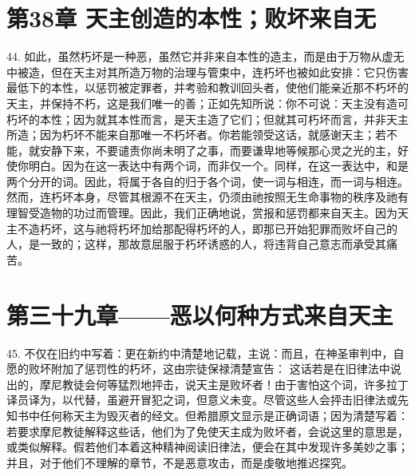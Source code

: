 
\section{第38章 天主创造的本性；败坏来自无}

44. 如此，虽然朽坏是一种恶，虽然它并非来自本性的造主，而是由于万物从虚无中被造，但在天主对其所造万物的治理与管束中，连朽坏也被如此安排：它只伤害最低下的本性，以惩罚被定罪者，并考验和教训回头者，使他们能亲近那不朽坏的天主，并保持不朽，这是我们唯一的善；正如先知所说：你不可说：天主没有造可朽坏的本性；因为就其本性而言，是天主造了它们；但就其可朽坏而言，并非天主所造；因为朽坏不能来自那唯一不朽坏者。你若能领受这话，就感谢天主；若不能，就安静下来，不要谴责你尚未明了之事，而要谦卑地等候那心灵之光的主，好使你明白。因为在这一表达中有两个词，而非仅一个。同样，在这一表达中，和是两个分开的词。因此，将属于各自的归于各个词，使一词与相连，而一词与相连。然而，连朽坏本身，尽管其根源不在天主，仍须由祂按照无生命事物的秩序及祂有理智受造物的功过而管理。因此，我们正确地说，赏报和惩罚都来自天主。因为天主不造朽坏，这与祂将朽坏加给那配得朽坏的人，即那已开始犯罪而败坏自己的人，是一致的；这样，那故意屈服于朽坏诱惑的人，将违背自己意志而承受其痛苦。\par


\section{第三十九章——恶以何种方式来自天主}

45. 不仅在旧约中写着：更在新约中清楚地记载，主说：而且，在神圣审判中，自愿的败坏附加了惩罚性的朽坏，这由宗徒保禄清楚宣告： 这话若是在旧律法中说出的，摩尼教徒会何等猛烈地抨击，说天主是败坏者！由于害怕这个词，许多拉丁译员译为，以代替，虽避开冒犯之词，但意义未变。尽管这些人会抨击旧律法或先知书中任何称天主为毁灭者的经文。但希腊原文显示是正确词语；因为清楚写着：若要求摩尼教徒解释这些话，他们为了免使天主成为败坏者，会说这里的意思是，或类似解释。假若他们本着这种精神阅读旧律法，便会在其中发现许多美妙之事；并且，对于他们不理解的章节，不是恶意攻击，而是虔敬地推迟探究。\par

